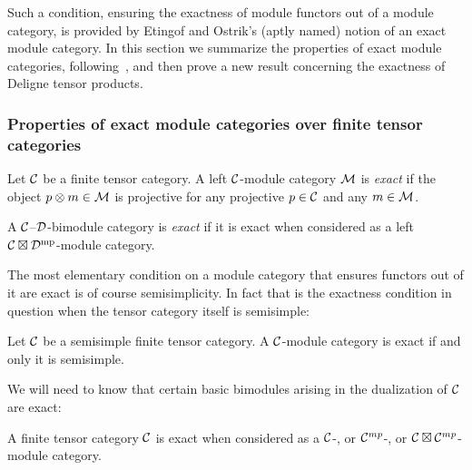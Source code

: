 \documentclass{amsart}
\begin{document}
Such a condition, ensuring the exactness of module functors out of a module category, is provided by Etingof and Ostrik's (aptly named) notion of an exact module category.  In this section we summarize the properties of exact module categories, following~\cite{EO-ftc}, and then prove a new result concerning the exactness of Deligne tensor products.

\subsubsection{Properties of exact module categories over finite tensor categories}

\begin{definition}
Let $\mathcal C$ be a finite tensor category.  A left $\mathcal C$-module category $\mathcal M$ is \emph{exact} 
if the object $p \otimes m \in \mathcal M$ is projective for any projective $p \in \mathcal C$ and any $m \in \mathcal M$.
\end{definition}

\begin{definition}
A $\mathcal C$--$\mathcal D$-bimodule category is \emph{exact} if it is exact when considered as a left $\mathcal C \boxtimes \mathcal D^{\mathrm{mp}}$-module category.
\end{definition}

The most elementary condition on a module category that ensures functors out of it are exact is of course semisimplicity.  In fact that is the exactness condition in question when the tensor category itself is semisimple:

\begin{example} \label{eg:semiexact}
Let $\mathcal C$ be a semisimple finite tensor category.  A $\mathcal C$-module category is exact if and only it is semisimple.
\end{example}

\nid We will need to know that certain basic bimodules arising in the dualization of $\mathcal C$ are exact:

\begin{example} \label{ex:exactness}
	A finite tensor category $\mathcal C$ is exact when considered as a $\mathcal C$-, or $\mathcal C^{mp}$-, or $\mathcal C \boxtimes \mathcal C^{mp}$-module category. 
\end{example}
\end{document}

